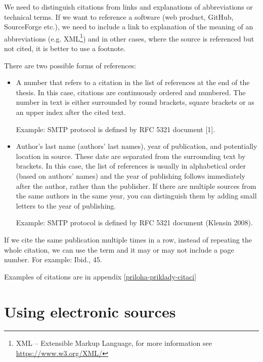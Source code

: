 We need to distinguish citations from links and explanations of abbreviations or technical terms. If we want to reference a software (web product, GitHub, SourceForge etc.), we need to include a link to explanation of the meaning of an abbreviations (e.g. XML\footnote{XML -- Extensible Markup Language, for more information see \url{https://www.w3.org/XML/}}) and in other cases, where the source is referenced but not cited, it is better to use a footnote.

There are two possible forms of references:
\begin{itemize}
  \item{A number that refers to a citation in the list of references at the end of the thesis. In this case, citations are continuously ordered and numbered. The number in text is either surrounded by round brackets, square brackets or as an upper index after the cited text.

  Example: SMTP protocol is defined by RFC 5321 document [1].}
  \item{Author's last name (authors' last names), year of publication, and potentially location in source. These date are separated from the surrounding text by brackets. In this case, the list of references is usually in alphabetical order (based on authors' names) and the year of publishing follows immediately after the author, rather than the publisher. If there are multiple sources from the same authors in the same year, you can distinguish them by adding small letters to the year of publishing.

  Example: SMTP protocol is defined by RFC 5321 document (Klensin 2008).}
\end{itemize}

If we cite the same publication multiple times in a row, instead of repeating the whole citation, we can use the term  and it may or may not include a page number. For example: Ibid., 45.

Examples of citations are in appendix \ref{priloha-priklady-citaci}


\section{Using electronic sources}

